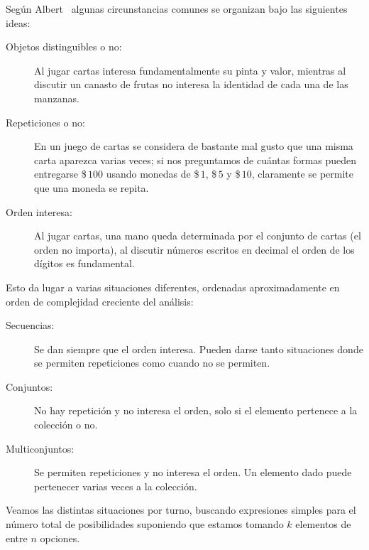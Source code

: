   Según Albert~%
    \cite{albert09:_basic_count_princ}
  algunas circunstancias comunes
  se organizan bajo las siguientes ideas:
  \begin{description}
  \item[Objetos distinguibles o no:]
    Al jugar cartas interesa fundamentalmente su pinta y valor,
    mientras al discutir un canasto de frutas
    no interesa la identidad de cada una de las manzanas.
  \item[Repeticiones o no:]
    En un juego de cartas
    se considera de bastante mal gusto
    que una misma carta aparezca varias veces;
    si nos preguntamos
    de cuántas formas pueden entregarse \$\,\(100\)
    usando monedas de \$\,\(1\), \$\,\(5\) y \$\,\(10\),
    claramente se permite que una moneda se repita.
  \item[Orden interesa:]
    Al jugar cartas,
    una mano queda determinada por el conjunto de cartas
    (el orden no importa),
    al discutir números escritos en decimal
    el orden de los dígitos es fundamental.
  \end{description}
  Esto da lugar a varias situaciones diferentes,
  ordenadas aproximadamente en orden de complejidad creciente
  del análisis:
  \begin{description}
  \item[Secuencias:]
    Se dan siempre que el orden interesa.
    Pueden darse tanto situaciones donde se permiten repeticiones
    como cuando no se permiten.
  \item[Conjuntos:]
    No hay repetición
    y no interesa el orden,
    solo si el elemento pertenece a la colección o no.
  \item[Multiconjuntos:]
    Se permiten repeticiones
    y no interesa el orden.
    Un elemento dado puede pertenecer varias veces a la colección.
  \end{description}
  Veamos las distintas situaciones por turno,
  buscando expresiones simples
  para el número total de posibilidades
  suponiendo que estamos tomando \(k\) elementos
  de entre \(n\) opciones.
